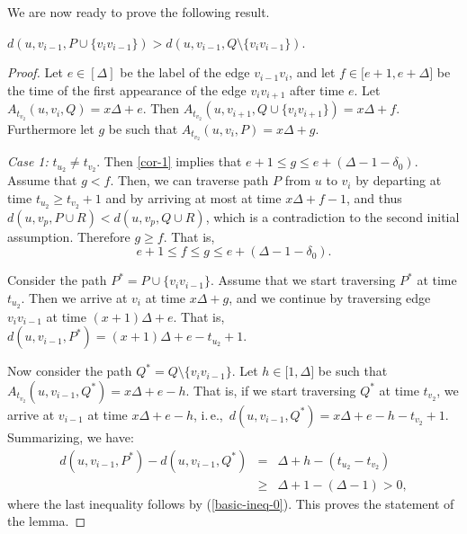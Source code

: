 \documentclass[a4paper,UKenglish,cleveref, autoref, thm-restate]{lipics-v2021}
\newcommand{\ie}{i.\,e.,\ }
\begin{document}
We are now ready to prove the following result.

	\begin{lemma}\label{lemma:FPT-twoPathsOneUnlabeledEdge}
		\label{lem-2}$d(u,v_{i-1},P\cup \{v_{i}v_{i-1}\})>d(u,v_{i-1},Q\setminus
		\{v_{i}v_{i-1}\})$.
	\end{lemma}
	\begin{proof}
		Let $e\in [\Delta]$ be the label of the edge $v_{i-1}v_{i}$, and
		let $f\in \lbrack e+1,e+\Delta ]$ be the time of the first appearance of the
		edge $v_{i}v_{i+1}$ after time $e$. Let $A_{t_{v_{2}}}(u,v_{i},Q)=x%
		\Delta +e$. Then $A_{t_{v_{2}}}(u,v_{i+1},Q\cup\{v_{i}v_{i+1}\})=x\Delta +f$. Furthermore let $g$ be such
		that $A_{t_{v_{2}}}(u,v_{i},P)=x\Delta +g$. 
		
		\emph{Case 1: }$t_{u_{2}}\neq t_{v_2}$. Then \cref{cor-1}
		implies that $e+1\leq g\leq e+(\Delta -1-\delta _{0})$. Assume that $g<f$.
		Then, we can traverse path $P$ from $u$ to $v_{i}$ by departing at time $%
		t_{u_{2}}\geq t_{v_2}+1$ and by arriving at most at time $x\Delta +f-1$,
		and thus $d(u,v_p,P\cup R)<d(u,v_p,Q\cup R)$, which is a
		contradiction to the second initial assumption. Therefore $g\geq f$. That is,%
		\begin{equation*}
			e+1\leq f\leq g\leq e+(\Delta -1-\delta _{0}).  %
		\end{equation*}
		
		Consider the path $P^{\ast }=P\cup \{v_{i}v_{i-1}\}$. Assume that we start
		traversing $P^{\ast }$ at time $t_{u_{2}}$. Then we arrive at $v_{i}$ at
		time $x\Delta +g$, and we continue by traversing edge $v_{i}v_{i-1}$ at time 
		$(x+1)\Delta +e$. That is, $d(u,v_{i-1},P^{\ast })=(x+1)\Delta
		+e-t_{u_{2}}+1$. 
		
		Now consider the path $Q^{\ast }=Q\setminus \{v_{i}v_{i-1}\}$. Let $h\in
		\lbrack 1,\Delta ]$ be such that $A_{t_{v_{2}}}(u,v_{i-1},Q^{\ast
		})=x\Delta +e-h$. That is, if we start traversing $Q^{\ast }$
		at time $t_{v_2}$, we arrive at $v_{i-1}$ at time $x\Delta +e-h$, \ie $%
		d(u,v_{i-1},Q^{\ast })=x\Delta +e-h-t_{v_2}+1$. Summarizing, we have:%
		\begin{eqnarray*}
			d(u,v_{i-1},P^{\ast })-d(u,v_{i-1},Q^{\ast }) &=&\Delta +h-(t_{u_{2}}-t_{v_2}) \\
			&\geq & \Delta +1-(\Delta-1)>0,
		\end{eqnarray*}%
		where the last inequality follows by (\ref{basic-ineq-0}). This proves the statement of the lemma.
		

\end{proof}
\end{document}
